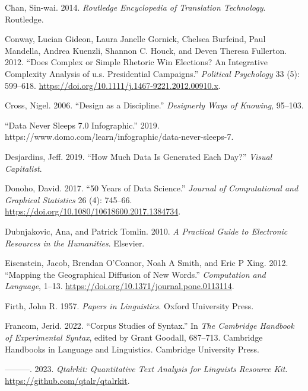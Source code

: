 \documentclass[
  letterpaper,
  DIV=11,
  numbers=noendperiod]{scrreport}
\newlength{\cslhangindent}
\newlength{\cslentryspacingunit} %
\newenvironment{CSLReferences}[2] %
 {%
  \setlength{\parindent}{0pt}
  \ifodd #1
  \let\oldpar\par
  \def\par{\hangindent=\cslhangindent\oldpar}
  \fi
  \setlength{\parskip}{#2\cslentryspacingunit}
 }%
 {}
\theoremstyle{definition}
\theoremstyle{remark}
\begin{document}
\begin{CSLReferences}{1}{0}
\leavevmode{}%
Chan, Sin-wai. 2014. \emph{Routledge Encyclopedia of Translation
Technology}. Routledge.

\leavevmode{}%
Conway, Lucian Gideon, Laura Janelle Gornick, Chelsea Burfeind, Paul
Mandella, Andrea Kuenzli, Shannon C. Houck, and Deven Theresa Fullerton.
2012. {``Does Complex or Simple Rhetoric Win Elections? An Integrative
Complexity Analysis of u.s. Presidential Campaigns.''} \emph{Political
Psychology} 33 (5): 599--618.
\url{https://doi.org/10.1111/j.1467-9221.2012.00910.x}.

\leavevmode{}%
Cross, Nigel. 2006. {``Design as a Discipline.''} \emph{Designerly Ways
of Knowing}, 95--103.

\leavevmode{}%
{``Data Never Sleeps 7.0 Infographic.''} 2019.
https://www.domo.com/learn/infographic/data-never-sleeps-7.

\leavevmode{}%
Desjardins, Jeff. 2019. {``How Much Data Is Generated Each Day?''}
\emph{Visual Capitalist}.

\leavevmode{}%
Donoho, David. 2017. {``50 Years of Data Science.''} \emph{Journal of
Computational and Graphical Statistics} 26 (4): 745--66.
\url{https://doi.org/10.1080/10618600.2017.1384734}.

\leavevmode{}%
Dubnjakovic, Ana, and Patrick Tomlin. 2010. \emph{A Practical Guide to
Electronic Resources in the Humanities}. Elsevier.

\leavevmode{}%
Eisenstein, Jacob, Brendan O'Connor, Noah A Smith, and Eric P Xing.
2012. {``Mapping the Geographical Diffusion of New Words.''}
\emph{Computation and Language}, 1--13.
\url{https://doi.org/10.1371/journal.pone.0113114}.

\leavevmode{}%
Firth, John R. 1957. \emph{Papers in Linguistics}. Oxford University
Press.

\leavevmode{}%
Francom, Jerid. 2022. {``Corpus Studies of Syntax.''} In \emph{The
Cambridge Handbook of Experimental Syntax}, edited by Grant Goodall,
687--713. Cambridge Handbooks in Language and Linguistics. Cambridge
University Press.

\leavevmode{}%
---------. 2023. \emph{Qtalrkit: Quantitative Text Analysis for
Linguists Resource Kit}. \url{https://github.com/qtalr/qtalrkit}.


\end{CSLReferences}
\end{document}
